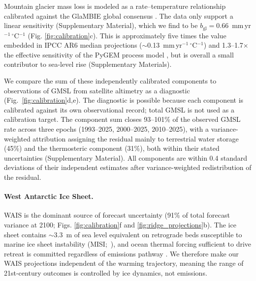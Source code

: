 \documentclass[12pt]{article}
\begin{document}
Mountain glacier mass loss is modeled as a rate--temperature relationship calibrated against the GlaMBIE global consensus \citep[2000--2023;][]{GlaMBIE2025}. The data only support a linear sensitivity (Supplementary Material), which we find to be $b_{\mathrm{gl}} = 0.66$~mm\,yr$^{-1}$\,$^\circ$C$^{-1}$ (Fig. \ref{fig:calibration}c). This is approximately five times the value embedded in IPCC AR6 median projections ($\sim$0.13~mm\,yr$^{-1}$\,$^\circ$C$^{-1}$) and 1.3--1.7$\times$ the effective sensitivity of the PyGEM process model \citep{Rounce2023}, but is overall a small contributor to sea-level rise (Supplementary Materials).

We compare the sum of these independently calibrated components to observations of GMSL from satellite altimetry as a diagnostic (Fig.~\ref{fig:calibration}d,e). The diagnostic is possible because each component is calibrated against its own observational record; total GMSL is not used as a calibration target. The component sum closes 93--101\% of the observed GMSL rate across three epochs (1993--2025, 2000--2025, 2010--2025), with a variance-weighted attribution assigning the residual mainly to terrestrial water storage (45\%) and the thermosteric component (31\%), both within their stated uncertainties (Supplementary Material). All components are within 0.4 standard deviations of their independent estimates after variance-weighted redistribution of the residual.

\paragraph{West Antarctic Ice Sheet.} WAIS is the dominant source of forecast uncertainty (91\% of total forecast variance at 2100; Figs. \ref{fig:calibration}f and \ref{fig:ridge_projections}b). The ice sheet contains $\sim$3.3~m of sea level equivalent on retrograde beds susceptible to marine ice sheet instability (MISI;~\cite{Joughin2014}), and ocean thermal forcing sufficient to drive retreat is committed regardless of emissions pathway \citep{Naughten2023,Rosier2025}. We therefore make our WAIS projections independent of the warming trajectory, meaning the range of 21st-century outcomes is controlled by ice dynamics, not emissions.
\end{document}
